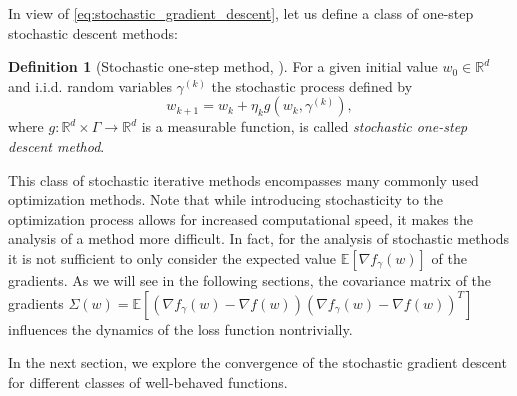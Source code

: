 \documentclass[12pt]{article}
\theoremstyle{definition}
\newtheorem{definition}[definition]{Definition}
\numberwithin{equation}{section}
\newcommand{\ev}[1]{\mathbb{E}\left[{#1}\right]}
\begin{document}
In view of \eqref{eq:stochastic_gradient_descent}, let us define a class of one-step stochastic descent methods:
\begin{definition}[Stochastic one-step method, ]
  For a given initial value $w_{0} \in \mathbb{R}^d$ and i.i.d. random variables $\gamma^{(k)}$ the stochastic process defined by
\begin{equation}
  w_{k+1} = w_{k} + \eta_k g(w_{k}, \gamma^{(k)}),
\end{equation}
  where $g:\mathbb{R}^d \times \Gamma \rightarrow \mathbb{R}^d$ is a measurable function, is called \emph{stochastic one-step descent method}.
\end{definition}
This class of stochastic iterative methods encompasses many commonly used optimization methods. Note that while introducing stochasticity to the optimization process allows for increased computational speed, it makes the analysis of a method more difficult. In fact, for the analysis of stochastic methods it is not sufficient to only consider the expected value $\ev{\nabla f_{\gamma}(w)}$ of the gradients. As we will see in the following sections, the covariance matrix of the gradients $\Sigma(w) = \mathbb{E}[(\nabla f_{\gamma}(w) - \nabla f(w)){(\nabla f_{\gamma}(w) - \nabla f(w))}^T]$ influences the dynamics of the loss function nontrivially.


In the next section, we explore the convergence of the stochastic gradient descent for different classes of well-behaved functions.
\end{document}
